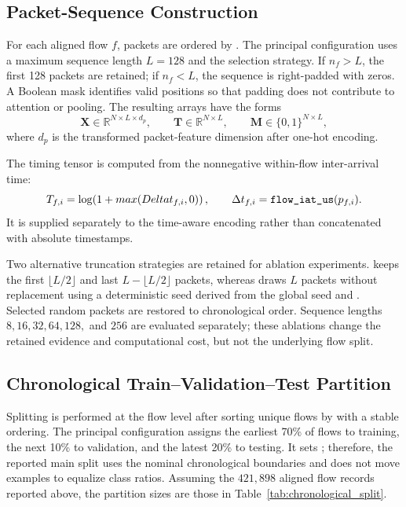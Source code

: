 \subsection{Packet-Sequence Construction}
\label{subsec:sequence_construction}

For each aligned flow $f$, packets are ordered by
. The principal configuration uses a maximum
sequence length $L=128$ and the  selection strategy. If
$n_f>L$, the first 128 packets are retained; if $n_f<L$, the sequence is
right-padded with zeros. A Boolean mask identifies valid positions so that
padding does not contribute to attention or pooling. The resulting arrays have
the forms
\begin{equation}
    \mathbf{X}\in\mathbb{R}^{N\times L\times d_p},\qquad
    \mathbf{T}\in\mathbb{R}^{N\times L},\qquad
    \mathbf{M}\in\{0,1\}^{N\times L},
    \label{eq:stage1_tensor_shapes}
\end{equation}
where $d_p$ is the transformed packet-feature dimension after one-hot
encoding.

The timing tensor is computed from the nonnegative within-flow inter-arrival
time:
\begin{equation}
    T_{f,i}=\log\!\left(1+max(Delta t_{f,i},0)\right),
    \qquad
    \Delta t_{f,i}=\datasetfield{flow_iat_us}(p_{f,i}).
    \label{eq:time_tensor}
\end{equation}
It is supplied separately to the time-aware encoding rather than concatenated
with absolute timestamps.

Two alternative truncation strategies are retained for ablation experiments.
 keeps the first $\lfloor L/2\rfloor$ and last
$L-\lfloor L/2\rfloor$ packets, whereas  draws $L$
packets without replacement using a deterministic seed derived from the global
seed and . Selected random packets are restored to
chronological order. Sequence lengths $8,16,32,64,128,$ and $256$ are evaluated
separately; these ablations change the retained evidence and computational
cost, but not the underlying flow split.

\subsection{Chronological Train--Validation--Test Partition}
\label{subsec:chronological_partition}

Splitting is performed at the flow level after sorting unique flows by
 with a stable ordering. The principal
configuration assigns the earliest 70\% of flows to training, the next 10\%
to validation, and the latest 20\% to testing. It sets
; therefore, the reported main split uses the
nominal chronological boundaries and does not move examples to equalize class
ratios. Assuming the $421{,}898$ aligned flow records reported above, the
partition sizes are those in Table~\ref{tab:chronological_split}.

